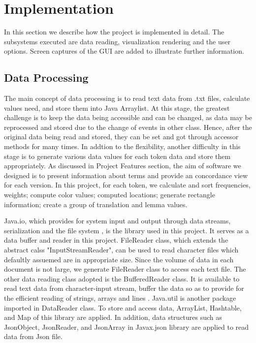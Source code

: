 \clearpage
\section{Implementation}
In this section we describe how the project is implemented in detail. The subsystems executed are data reading, visualization rendering and the user options. Screen captures of the GUI are added to illustrate further information.

\subsection{Data Processing}

The main concept of data processing is to read text data from .txt files, calculate values need, and store them into Java Arraylist. At this stage, the greatest challenge is to keep the data being accessible and can be changed, as data may be reprocessed and stored due to the change of events in other class. Hence, after the original data being read and stored, they can be set and got through accessor methods \cite{Bob's coding convention} for many times. In addtion to the flexibility, another difficulty in this stage is to generate various data values for each token data and store them appropriately. As discussed in Project Features section, the aim of software we designed is to present information about terms and provide an concordance view for each version. In this project, for each token, we calculate and sort frequencies, weights; compute color values; computed locations; generate rectangle information; create a group of translation and lemma values.

Java.io, which provides for system input and output through data streams, serialization and the file system \cite{javadoc java.io}, is the library used in this project. It serves as a data buffer and reader in this project. FileReader class, which extends the abstract calss "InputStreamReader", can be used to read character files which defaultly assuemed are in appropriate size. Since the volume of data in each document is not large, we generate FileReader class to access each text file. The other data reading class adopted is the BufferedReader class. It is available to read text data from character-input stream, buffer the data so as to provide for the efficient reading of strings, arrays and lines \cite{javadoc7}. Java.util is another package imported in DataReader class. To store and access data, ArrayList, Hashtable, and Map of this library are applied. In addition, data structures such as JsonObject, JsonReader, and JsonArray in Javax.json library are applied to read data from Json file.

